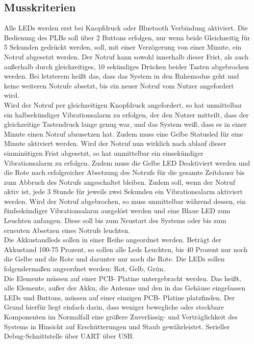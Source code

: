 \documentclass[a4paper]{scrreprt}
\begin{document}
\subsection{Musskriterien}
Alle LEDs werden erst bei Knopfdruck oder Bluetooth Verbindung aktiviert.
Die Bedienung des PLBs soll über 2 Buttons erfolgen, nur wenn beide Gleichzeitig für 5 Sekunden gedrückt werden, soll, mit einer Verzögerung von einer Minute, ein Notruf abgesetzt werden. Der Notruf kann sowohl innerhalb dieser Frist, als auch außerhalb durch gleichzeitiges, 10 sekündiges Drücken beider Tasten abgebrochen werden. Bei letzterem heißt das, dass das System in den Ruhemodus geht und keine weiteren Notrufe absetzt, bis ein neuer Notruf vom Nutzer angefordert wird.\\
Wird der Notruf per gleichzeitigen Knopfdruck angefordert, so hat unmittelbar ein halbsekündiger Vibrationsalarm zu erfolgen, der den Nutzer mitteilt, dass der gleichzeitige Tastendruck lange genug war, und das System weiß, dass es in einer Minute einen Notruf abzusetzen hat. Zudem muss eine Gelbe Statusled für eine Minute aktiviert werden. Wird der Notruf nun wirklich nach ablauf dieser einminütigen Frist abgesetzt, so hat unmittelbar ein einsekündiger Vibrationsalarm zu erfolgen. Zudem muss die Gelbe LED Deaktiviert werden und die Rote nach erfolgreicher Absetzung des Notrufs für die gesamte Zeitdauer bis zum Abbruch des Notrufs angeschaltet bleiben. Zudem soll, wenn der Notruf aktiv ist, jede 3 Stunde für jeweils zwei Sekunden ein Vibrationsalarm aktiviert werden. Wird der Notruf abgebrochen, so muss unmittelbar während dessen, ein fünfsekündiger Vibrationsalarm ausgelöst werden und eine Blaue LED zum Leuchten anfangen. Diese soll bis zum Neustart des Systems oder bis zum erneuten Absetzen eines Notrufs leuchten.
\\Die Akkustandleds sollen in einer Reihe angeordnet werden. Beträgt der Akkustand 100-75 Prozent, so sollen alle Leds Leuchten, bis 40 Prozent nur noch die Gelbe und die Rote und darunter nur noch die Rote. Die LEDs sollen folgendermaßen angeordnet werden: Rot, Gelb, Grün.\\ 
Die Elemente müssen auf einer PCB- Platine untergebracht werden. Das heißt, alle Elemente, außer der Akku, die Antenne und den in das Gehäuse eingelassen LEDs und Buttons, müssen auf einer einzigen PCB- Platine platzfinden. Der Grund hierfür liegt einfach darin, dass weniger bewegliche oder steckbare Komponenten im Normalfall eine größere Zuverlässig- und Verträglichkeit des Systems in Hinsicht auf Erschütterungen und Staub gewährleistet. Serieller Debug-Schnittstelle über UART über USB.
\end{document}
